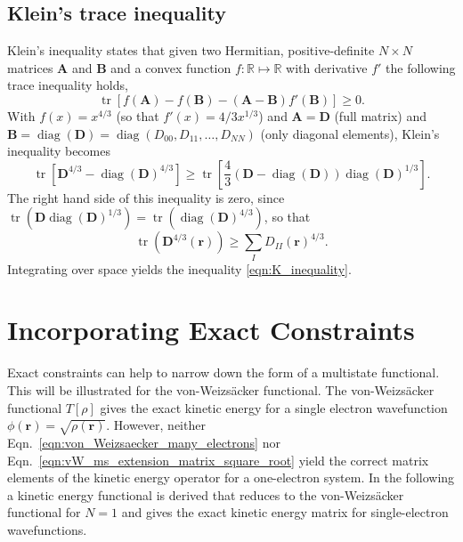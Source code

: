 \documentclass[journal=jpca,manuscript=article,layout=singlecolumn]{achemso}
\DeclareMathOperator{\tr}{tr}
\DeclareMathOperator{\Diag}{diag}
\newcommand\m[1]{\mathbf{#1}}
\renewcommand\vec[1]{\mathbf{#1}}
\begin{document}
\subsection{Klein's trace inequality}
\label{sec:Kleins_inequality}
Klein's inequality \cite{wiki:Kleins_inequality} \cite{Ruelle1969statistical} states that given two Hermitian, positive-definite $N \times N$ matrices $\m{A}$ and $\m{B}$ and
a convex function $f: \mathbb{R} \mapsto \mathbb{R}$ with derivative $f'$ the following trace inequality holds,
\begin{equation}
\tr\left[ f(\m{A}) - f(\m{B}) - (\m{A} - \m{B}) f'(\m{B}) \right] \ge 0 \label{eqn:Kleins_inequality}.
\end{equation}
With $f(x) = x^{4/3}$ (so that $f'(x) = 4/3 x^{1/3}$) and $\m{A} = \m{D}$ (full matrix) and $\m{B} = \Diag(\m{D}) = \Diag(D_{00}, D_{11}, \ldots, D_{NN})$ (only diagonal elements),
Klein's inequality becomes
\begin{equation}
\tr\left[ \m{D}^{4/3} - \Diag(\m{D})^{4/3} \right] \ge \tr\left[ \frac{4}{3} \left(\m{D} - \Diag(\m{D})\right) \Diag(\m{D})^{1/3}\right].
\end{equation}
The right hand side of this inequality is zero, since $\tr(\m{D} \Diag(\m{D})^{1/3}) = \tr(\Diag(\m{D})^{4/3})$, so that 
\begin{equation}
\tr(\m{D}^{4/3}(\vec{r})) \ge \sum_I D_{II}(\vec{r})^{4/3}.
\end{equation}
Integrating over space yields the inequality \ref{eqn:K_inequality}.

\section{Incorporating Exact Constraints}
\label{sec:exact_constraints}
Exact constraints can help to narrow down the form of a multistate functional.
This will be illustrated for the von-Weizs\"{a}cker functional.
The von-Weizs\"{a}cker functional $T[\rho]$ gives the exact kinetic energy for a single electron wavefunction $\phi(\vec{r}) = \sqrt{\rho(\vec{r})}$.
However, neither Eqn.~\ref{eqn:von_Weizsaecker_many_electrons} nor Eqn.~\ref{eqn:vW_ms_extension_matrix_square_root} yield the correct
matrix elements of the kinetic energy operator for a one-electron system.
In the following a kinetic energy functional is derived that reduces to the von-Weizs\"{a}cker functional for $N=1$ and gives the
exact kinetic energy matrix for single-electron wavefunctions.
\end{document}
